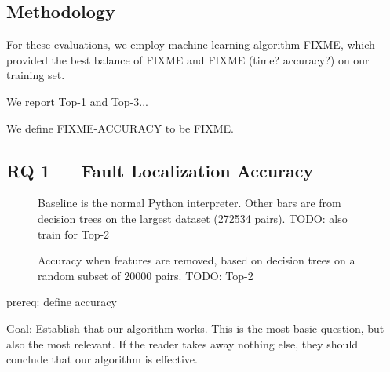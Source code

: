 \documentclass[conference]{IEEEtran}
\begin{document}
\subsection{Methodology}

For these evaluations, we employ machine learning algorithm FIXME, which
provided the best balance of FIXME and FIXME (time? accuracy?) on our
training set.

We report Top-1 and Top-3...

We define FIXME-ACCURACY to be FIXME.

\subsection{RQ 1 --- Fault Localization Accuracy}

\begin{figure}
\caption{Baseline is the normal Python interpreter. Other bars are from decision
trees on the largest dataset (272534 pairs). TODO: also train for Top-2}
\label{fig:full-dataset-acc}
\end{figure}

\begin{figure}
\caption{Accuracy when features are removed, based on decision trees on a random subset of 20000 pairs.
TODO: Top-2}
\label{fig:removing-features}
\end{figure}


prereq: define accuracy

Goal: Establish that our algorithm works. This is the most basic question,
but also the most relevant. If the reader takes away nothing else, they
should conclude that our algorithm is effective.
\end{document}
